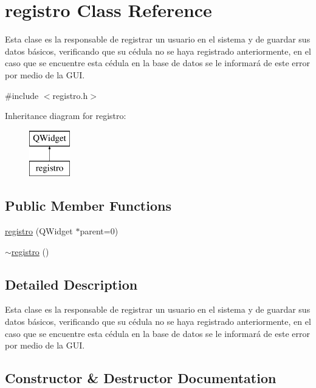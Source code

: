 \hypertarget{classregistro}{}\section{registro Class Reference}
\label{classregistro}


Esta clase es la responsable de registrar un usuario en el sistema y de guardar sus datos básicos, verificando que su cédula no se haya registrado anteriormente, en el caso que se encuentre esta cédula en la base de datos se le informará de este error por medio de la G\+UI.  




{\ttfamily \#include $<$registro.\+h$>$}

Inheritance diagram for registro\+:\begin{figure}[H]
\begin{center}
\leavevmode
\includegraphics[height=2.000000cm]{classregistro}
\end{center}
\end{figure}
\subsection*{Public Member Functions}
\begin{DoxyCompactItemize}
\item 
\hyperlink{classregistro_a1603a3ccdbb5e4fb01ba21158e3f8dfa}{registro} (Q\+Widget $\ast$parent=0)
\item 
\hyperlink{classregistro_addf760db779d168a84ef54c49ada3c74}{$\sim$registro} ()
\end{DoxyCompactItemize}


\subsection{Detailed Description}
Esta clase es la responsable de registrar un usuario en el sistema y de guardar sus datos básicos, verificando que su cédula no se haya registrado anteriormente, en el caso que se encuentre esta cédula en la base de datos se le informará de este error por medio de la G\+UI. 

\subsection{Constructor \& Destructor Documentation}
\mbox{\label{classregistro_a1603a3ccdbb5e4fb01ba21158e3f8dfa}} 
